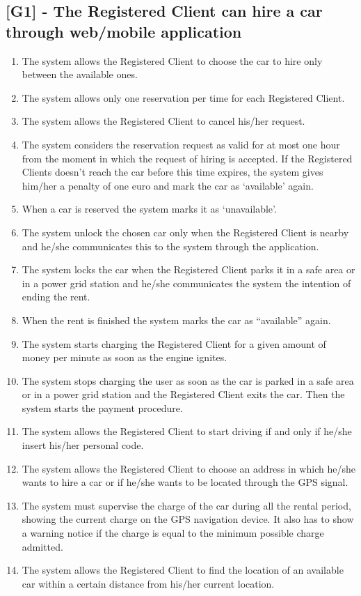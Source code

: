 \subsection{[G1] - The Registered Client can hire a car through web/mobile application}
\begin{enumerate}[label=\textbf{R1.\arabic*)}]
\item The system allows the Registered Client to choose the car to hire only between the available ones.
\item The system allows only one reservation per time for each Registered Client.
\item The system allows the Registered Client to cancel his/her request.
\item The system considers the reservation request as valid for at most one hour from the moment in which the request of hiring is accepted.
If the Registered Clients doesn’t reach the car before this time expires, the system gives him/her a penalty of one euro and mark the car as ‘available’ again.
\item When a car is reserved the system marks it as ‘unavailable’.
\item The system unlock the chosen car only when the Registered Client is nearby and he/she communicates this to the system through the application.
\item The system locks the car when the Registered Client parks it in a safe area or in a power grid station and he/she communicates the system the intention of ending the rent.
\item When the rent is finished the system marks the car as “available” again.
\item The system starts charging the Registered Client for a given amount of money per minute as soon as the engine ignites.
\item The system stops charging the user as soon as the car is parked in a safe area or in a power grid station and the Registered Client exits the car.
Then the system starts the payment procedure.
\item The system allows the Registered Client to start driving if and only if he/she insert his/her personal code.
\item The system allows the Registered Client to choose an address in which he/she wants to hire a car or if he/she wants to be located through the GPS signal.
\item The system must supervise the charge of the car during all the rental period, showing the current charge on the GPS navigation device.
It also has to show a warning notice if the charge is equal to the minimum possible charge admitted.
\item The system allows the Registered Client to find the location of an available car within a certain distance from his/her current location.
\end{enumerate}

